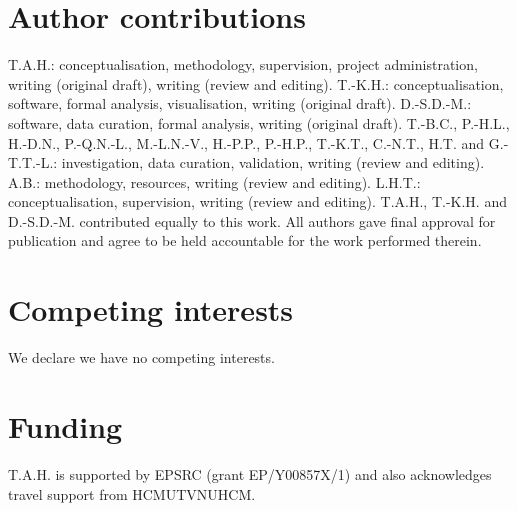 \documentclass[11pt,a4paper]{article}
\begin{document}
\section*{Author contributions}
T.A.H.: conceptualisation, methodology, supervision, project administration, writing (original draft), writing (review and editing).
T.-K.H.: conceptualisation, software, formal analysis, visualisation, writing (original draft).
D.-S.D.-M.: software, data curation, formal analysis, writing (original draft).
T.-B.C., P.-H.L., H.-D.N., P.-Q.N.-L., M.-L.N.-V., H.-P.P., P.-H.P., T.-K.T., C.-N.T., H.T. and G.-T.T.-L.: investigation, data curation, validation, writing (review and editing).
A.B.: methodology, resources, writing (review and editing).
L.H.T.: conceptualisation,  supervision,  writing (review and editing).
T.A.H., T.-K.H. and D.-S.D.-M. contributed equally to this work.
All authors gave final approval for publication and agree to be held accountable for the work performed therein.

\section*{Competing interests}
We declare we have no competing interests.

\section*{Funding}
T.A.H. is supported by EPSRC (grant EP/Y00857X/1) and also acknowledges travel support from HCMUT\text{-}VNUHCM.



\end{document}
